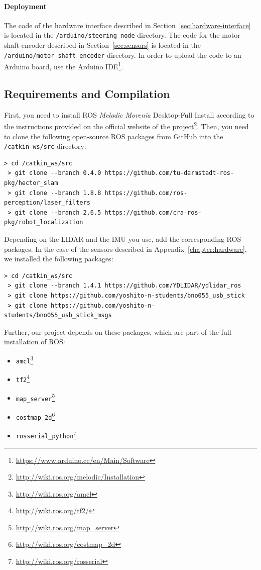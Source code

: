 \paragraph{Deployment}

The code of the hardware interface described in Section~\ref{sec:hardware-interface} is located in the \texttt{/arduino/steering\_node} directory. The code for the motor shaft encoder described in Section~\ref{sec:sensors} is located in the \texttt{/arduino/motor\_\-shaft\_encoder} directory. In order to upload the code to an Arduino board, use the Arduino IDE\footnote{\url{https://www.arduino.cc/en/Main/Software}}.

\subsection{Requirements and Compilation}

First, you need to install \gls{ROS} \textit{Melodic Morenia} Desktop-Full Install according to the instructions provided on the official website of the project\footnote{\url{http://wiki.ros.org/melodic/Installation}}. Then, you need to clone the following open-source \gls*{ROS} packages from GitHub into the \texttt{/catkin\_ws/src} directory:

\begin{Verbatim}[fontsize=\small]
 > cd /catkin_ws/src
 > git clone --branch 0.4.0 https://github.com/tu-darmstadt-ros-pkg/hector_slam
 > git clone --branch 1.8.8 https://github.com/ros-perception/laser_filters
 > git clone --branch 2.6.5 https://github.com/cra-ros-pkg/robot_localization
\end{Verbatim}

Depending on the \gls*{LIDAR} and the \gls*{IMU} you use, add the corresponding ROS packages. In the case of the sensors described in Appendix~\ref{chapter:hardware}, we installed the following packages:

\begin{Verbatim}[fontsize=\small]
 > cd /catkin_ws/src
 > git clone --branch 1.4.1 https://github.com/YDLIDAR/ydlidar_ros
 > git clone https://github.com/yoshito-n-students/bno055_usb_stick
 > git clone https://github.com/yoshito-n-students/bno055_usb_stick_msgs
\end{Verbatim}

Further, our project depends on these packages, which are part of the full installation of ROS:

\begin{itemize}
	\item \texttt{amcl}\footnote{\url{http://wiki.ros.org/amcl}}
	\item \texttt{tf2}\footnote{\url{http://wiki.ros.org/tf2/}}
	\item \texttt{map\_server}\footnote{\url{http://wiki.ros.org/map_server}}
	\item \texttt{costmap\_2d}\footnote{\url{http://wiki.ros.org/costmap_2d}}
	\item \texttt{rosserial\_python}\footnote{\url{http://wiki.ros.org/rosserial}}
\end{itemize}

